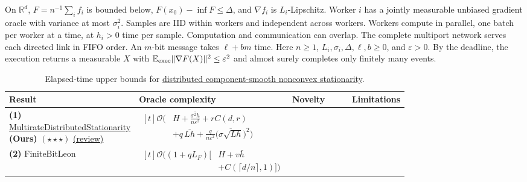 \begin{table}[tp]
\centering
\caption{Elapsed-time upper bounds for \href{https://github.com/k3nfalt/longtails/blob/main/LongTails/Setups/DistributedComponentSmoothNonconvex.lean}{distributed component-smooth nonconvex stationarity}.}\label{tab:DistributedComponentSmoothNonconvex}
\parbox{\linewidth}{\footnotesize On $\mathbb R^d$, $F=n^{-1}\sum_i f_i$ is bounded below, $F(x_0)-\inf F\le\Delta$, and $\nabla f_i$ is $L_i$-Lipschitz. Worker $i$ has a jointly measurable unbiased gradient oracle with variance at most $\sigma_i^2$. Samples are IID within workers and independent across workers. Workers compute in parallel, one batch per worker at a time, at $h_i>0$ time per sample. Computation and communication can overlap. The complete multiport network serves each directed link in FIFO order. An $m$-bit message takes $\ell+bm$ time. Here $n\ge1$, $L_i,\sigma_i,\Delta,\ell,b\ge0$, and $\varepsilon>0$. By the deadline, the execution returns a measurable $X$ with $\mathbb E_{\rm exec}\|\nabla F(X)\|^2\le\varepsilon^2$ and almost surely completes only finitely many events.}\par\smallskip
\begin{threeparttable}
\footnotesize
\setlength{\tabcolsep}{4pt}\renewcommand{\arraystretch}{1.25}
\begin{tabularx}{\linewidth}{@{}>{\raggedright\arraybackslash}p{0.18\linewidth}>{\raggedright\arraybackslash}p{0.30\linewidth}>{\raggedright\arraybackslash}p{0.29\linewidth}>{\raggedright\arraybackslash}X@{}}
\toprule
\textbf{Result} & \textbf{Oracle complexity} & \textbf{Novelty} & \textbf{Limitations} \\
\midrule
\textbf{(1)} \href{https://github.com/k3nfalt/longtails/blob/main/LongTails/Theorems/MultirateDistributedStationarity.lean}{Multirate\allowbreak Distributed\allowbreak Stationarity} \textbf{(Ours)} $(\star\star\star)$ \href{https://github.com/k3nfalt/longtails/blob/main/scripts/reviews/MultirateDistributedStationarity.md}{(review)}
& $\begin{aligned}[t]
\mathcal{O}\Big(&H+\tfrac{\overline{\sigma^2 h}}{n\varepsilon^2}+r C(d,r)\\
 &+q\,\overline{Lh}+\tfrac{q}{n\varepsilon^2}\big(\overline{\sigma\sqrt{Lh}}\big)^2\Big)
\end{aligned}$ & & \\
\midrule[1.2pt]
\textbf{(2)} FiniteBit\allowbreak Leon \citep{dcsnFiniteBitLeon}
& $\begin{aligned}[t]\mathcal{O}\big((1+qL_F)\big[&H+v\bar h\\[-2pt] &+C(\lceil d/n\rceil,1)\big]\big)\end{aligned}$

\end{tabularx}
\end{threeparttable}
\end{table}
